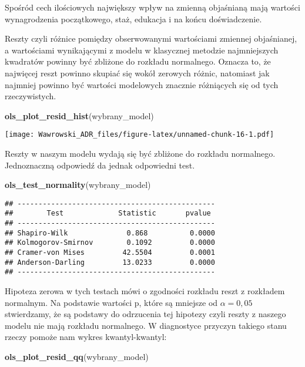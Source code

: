 \documentclass[]{book}
\newenvironment{Shaded}{\begin{snugshade}}{\end{snugshade}}
\newcommand{\KeywordTok}[1]{\textcolor[rgb]{0.13,0.29,0.53}{\textbf{#1}}}
\newcommand{\NormalTok}[1]{#1}
\begin{document}
Spośród cech ilościowych największy wpływ na zmienną objaśnianą mają
wartości wynagrodzenia początkowego, staż, edukacja i na końcu
doświadczenie.

Reszty czyli różnice pomiędzy obserwowanymi wartościami zmiennej
objaśnianej, a wartościami wynikającymi z modelu w klasycznej metodzie
najmniejszych kwadratów powinny być zbliżone do rozkładu normalnego.
Oznacza to, że najwięcej reszt powinno skupiać się wokół zerowych
różnic, natomiast jak najmniej powinno być wartości modelowych znacznie
różniących się od tych rzeczywistych.

\begin{Shaded}
\begin{Highlighting}[]
\KeywordTok{ols_plot_resid_hist}\NormalTok{(wybrany_model)}
\end{Highlighting}
\end{Shaded}

\texttt{[image: Wawrowski\_ADR\_files/figure-latex/unnamed-chunk-16-1.pdf]}

Reszty w naszym modelu wydają się być zbliżone do rozkładu normalnego.
Jednoznaczną odpowiedź da jednak odpowiedni test.

\begin{Shaded}
\begin{Highlighting}[]
\KeywordTok{ols_test_normality}\NormalTok{(wybrany_model)}
\end{Highlighting}
\end{Shaded}

\begin{verbatim}
## -----------------------------------------------
##        Test             Statistic       pvalue  
## -----------------------------------------------
## Shapiro-Wilk              0.868          0.0000 
## Kolmogorov-Smirnov        0.1092         0.0000 
## Cramer-von Mises         42.5504         0.0001 
## Anderson-Darling         13.0233         0.0000 
## -----------------------------------------------
\end{verbatim}

Hipoteza zerowa w tych testach mówi o zgodności rozkładu reszt z
rozkładem normalnym. Na podstawie wartości p, które są mniejsze od
\(\alpha=0,05\) stwierdzamy, że są podstawy do odrzucenia tej hipotezy
czyli reszty z naszego modelu nie mają rozkładu normalnego. W
diagnostyce przyczyn takiego stanu rzeczy pomoże nam wykres
kwantyl-kwantyl:

\begin{Shaded}
\begin{Highlighting}[]
\KeywordTok{ols_plot_resid_qq}\NormalTok{(wybrany_model)}
\end{Highlighting}
\end{Shaded}
\end{document}
